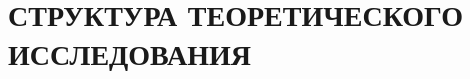 \section[Структура теоретического исследования]
{СТРУКТУРА ТЕОРЕТИЧЕСКОГО \\ ИССЛЕДОВАНИЯ}


\pagebreak

